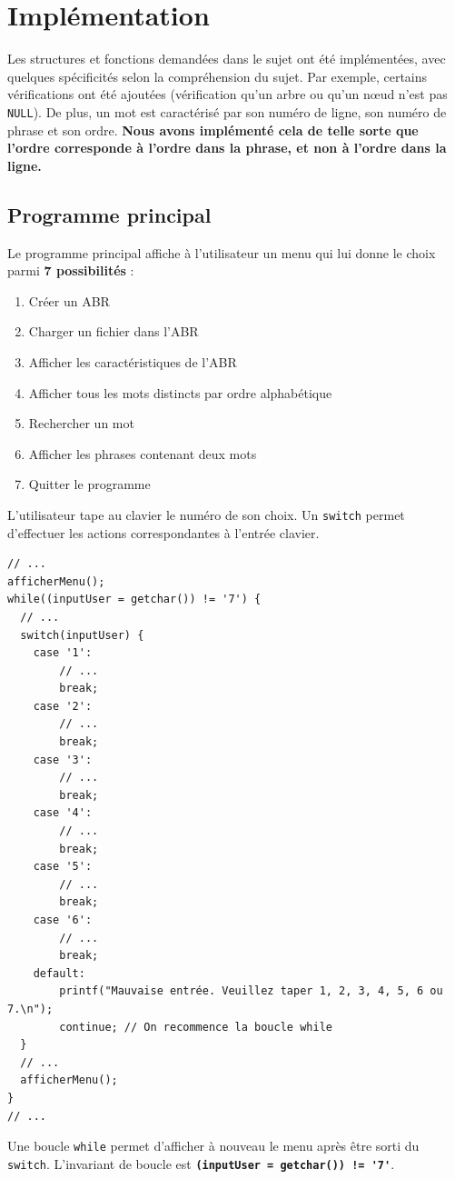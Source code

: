 \chapter{Implémentation}
Les structures et fonctions demandées dans le sujet ont été implémentées, avec quelques spécificités selon la compréhension du sujet. Par exemple, certains vérifications ont été ajoutées (vérification qu'un arbre ou qu'un n\oe ud n'est pas \lstinline{NULL}). De plus, un mot est caractérisé par son numéro de ligne, son numéro de phrase et son ordre. \textbf{\color{red}Nous avons implémenté cela de telle sorte que l'ordre corresponde à l'ordre dans la phrase, et non à l'ordre dans la ligne.}

\section{Programme principal}
Le programme principal affiche à l'utilisateur un menu qui lui donne le choix parmi \textbf{7 possibilités} :
\begin{enumerate}
  \item Créer un ABR
  \item Charger un fichier dans l'ABR
  \item Afficher les caractéristiques de l'ABR
  \item Afficher tous les mots distincts par ordre alphabétique
  \item Rechercher un mot
  \item Afficher les phrases contenant deux mots
  \item Quitter le programme
\end{enumerate}
L'utilisateur tape au clavier le numéro de son choix. Un \lstinline{switch} permet d'effectuer les actions correspondantes à l'entrée clavier.
\begin{lstlisting}
// ...
afficherMenu();
while((inputUser = getchar()) != '7') {
  // ...
  switch(inputUser) {
    case '1':
        // ...
        break;
    case '2':
        // ...
        break;
    case '3':
        // ...
        break;
    case '4':
        // ...
        break;
    case '5':
        // ...
        break;
    case '6':
        // ...
        break;
    default:
        printf("Mauvaise entrée. Veuillez taper 1, 2, 3, 4, 5, 6 ou 7.\n");
        continue; // On recommence la boucle while
  }
  // ...
  afficherMenu();
}
// ...
\end{lstlisting}
Une boucle \lstinline{while} permet d'afficher à nouveau le menu après être sorti du \lstinline{switch}. L'invariant de boucle est \textbf{\lstinline{(inputUser = getchar()) != '7'}}.

